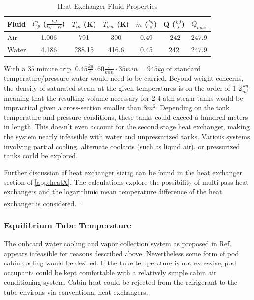 \documentclass[heading.tex]{subfiles}
\begin{document}

\begin{table}
    \centering
    \caption{Heat Exchanger Fluid Properties}
    \label{tab:HeatEx}
    \begin{tabular}{l  c  c  c  c  c  c} 
        \hline
        Fluid & $C_{p}$ ($\frac{kJ}{kg-K}$)& $T_{in}$ (K) & $T_{out}$ (K) & $\dot{m}$ ($\frac{kg}{s}$) & Q ($\frac{kJ}{s}$) & $Q_{max}$\\ \hline 
        Air & 1.006 & 791 & 300 & 0.49 & -242 & 247.9\\ 
        Water & 4.186 & 288.15 & 416.6 &0.45 & 242 & 247.9\\ \hline
    \end{tabular}
\end{table}

With a 35 minute trip, $0.45 \frac{kg}{s} \cdot 60 \frac{s}{min} \cdot 35min = 945 kg$
of standard temperature/pressure water would need to be carried.
Beyond weight concerns, the density of saturated steam at the given temperatures is on the order of 1-2$\frac{kg}{m^{3}}$
meaning that the resulting volume necessary for 2-4 atm
steam tanks would be impractical given a cross-section smaller than 8$m^{2}$.
Depending on the tank temperature and pressure conditions, these tanks could exceed a hundred meters in length.
This doesn't even account for the second stage heat exchanger,
making the system nearly infeasible with water and unpressurized tanks.
Various systems involving partial cooling, alternate coolants (such as liquid air), or pressurized tanks could be explored.

Further discussion of heat exchanger sizing can be found in the heat exchanger section of \cref{app:heatX}.
The calculations explore the possibility of multi-pass heat exchangers
and the logarithmic mean temperature difference of the heat exchanger is considered.
\cite{Cengal}\textsuperscript{,}
\cite{Turns}


\subsubsection{Equilibrium Tube Temperature}

The onboard water cooling and vapor collection system as proposed in Ref. 
appears infeasible for reasons described above.
Nevertheless some form of pod cabin cooling would be desired. 
If the tube temperature is not excessive,
pod occupants could be kept comfortable with a relatively simple cabin air conditioning system.
Cabin heat could be rejected from the refrigerant to the tube environs via conventional heat
exchangers.
\end{document}
